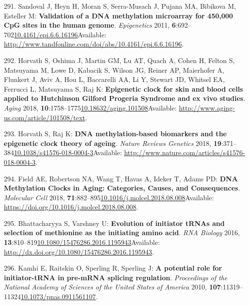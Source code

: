 \documentclass[
]{book}
\begin{document}
\leavevmode\hypertarget{ref-Sandoval2011}{}%
291. Sandoval J, Heyn H, Moran S, Serra-Musach J, Pujana MA, Bibikova M, Esteller M: \textbf{Validation of a DNA methylation microarray for 450,000 CpG sites in the human genome}. \emph{Epigenetics} 2011, \textbf{6}:692--702\href{https://doi.org/10.4161/epi.6.6.16196}{10.4161/epi.6.6.16196}Available: \url{http://www.tandfonline.com/doi/abs/10.4161/epi.6.6.16196}.

\leavevmode\hypertarget{ref-Horvath2018a}{}%
292. Horvath S, Oshima J, Martin GM, Lu AT, Quach A, Cohen H, Felton S, Matsuyama M, Lowe D, Kabacik S, Wilson JG, Reiner AP, Maierhofer A, Flunkert J, Aviv A, Hou L, Baccarelli AA, Li Y, Stewart JD, Whitsel EA, Ferrucci L, Matsuyama S, Raj K: \textbf{Epigenetic clock for skin and blood cells applied to Hutchinson Gilford Progeria Syndrome and ex vivo studies}. \emph{Aging} 2018, \textbf{10}:1758--1775\href{https://doi.org/10.18632/aging.101508}{10.18632/aging.101508}Available: \url{http://www.aging-us.com/article/101508/text}.

\leavevmode\hypertarget{ref-Horvath2018}{}%
293. Horvath S, Raj K: \textbf{DNA methylation-based biomarkers and the epigenetic clock theory of ageing}. \emph{Nature Reviews Genetics} 2018, \textbf{19}:371--384\href{https://doi.org/10.1038/s41576-018-0004-3}{10.1038/s41576-018-0004-3}Available: \url{http://www.nature.com/articles/s41576-018-0004-3}.

\leavevmode\hypertarget{ref-Field2018}{}%
294. Field AE, Robertson NA, Wang T, Havas A, Ideker T, Adams PD: \textbf{DNA Methylation Clocks in Aging: Categories, Causes, and Consequences}. \emph{Molecular Cell} 2018, \textbf{71}:882--895\href{https://doi.org/10.1016/j.molcel.2018.08.008}{10.1016/j.molcel.2018.08.008}Available: \url{https://doi.org/10.1016/j.molcel.2018.08.008}.

\leavevmode\hypertarget{ref-Bhattacharyya2016}{}%
295. Bhattacharyya S, Varshney U: \textbf{Evolution of initiator tRNAs and selection of methionine as the initiating amino acid}. \emph{RNA Biology} 2016, \textbf{13}:810--819\href{https://doi.org/10.1080/15476286.2016.1195943}{10.1080/15476286.2016.1195943}Available: \url{http://dx.doi.org/10.1080/15476286.2016.1195943}.

\leavevmode\hypertarget{ref-Kamhi2010}{}%
296. Kamhi E, Raitskin O, Sperling R, Sperling J: \textbf{A potential role for initiator-tRNA in pre-mRNA splicing regulation}. \emph{Proceedings of the National Academy of Sciences of the United States of America} 2010, \textbf{107}:11319--11324\href{https://doi.org/10.1073/pnas.0911561107}{10.1073/pnas.0911561107}.
\end{document}
